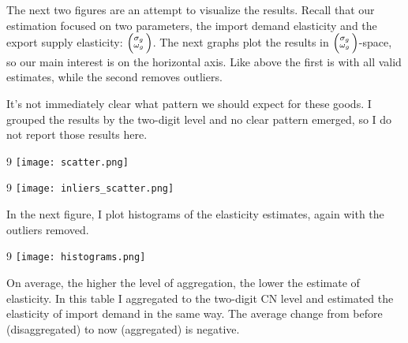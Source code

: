 \documentclass[12pt,a4paper]{article}                      %
\begin{document}
\newpage

The next two figures are an attempt to visualize the results.
Recall that our estimation focused on two parameters, the import demand elasticity and the export supply elasticity: $\Bigl(\negthinspace\begin{smallmatrix}\sigma_g\\\omega_g\end{smallmatrix}\Bigr)$.
The next graphs plot the results in $\Bigl(\negthinspace\begin{smallmatrix}\sigma_g\\\omega_g\end{smallmatrix}\Bigr)$-space, so our main interest is on the horizontal axis.
Like above the first is with all valid estimates, while the second removes outliers.

It's not immediately clear what pattern we should expect for these goods.
I grouped the results by the two-digit level and no clear pattern emerged, so I do not report those results here.

\begin{landscape}
\thispagestyle{empty}
\begin{center}
\footnotesize 9
    \texttt{[image: scatter.png]}
\end{center}
\end{landscape}
\restoregeometry


\begin{landscape}
\thispagestyle{empty}
\begin{center}
\footnotesize 9
    \texttt{[image: inliers\_scatter.png]}
\end{center}
\end{landscape}
\restoregeometry

In the next figure, I plot histograms of the elasticity estimates, again with the outliers removed.

\begin{landscape}
\thispagestyle{empty}
\begin{center}
\footnotesize 9
    \texttt{[image: histograms.png]}
\end{center}
\end{landscape}
\restoregeometry

On average, the higher the level of aggregation, the lower the estimate of elasticity.
In this table I aggregated to the two-digit CN level and estimated the elasticity of import demand in the same way.
The average change from before (disaggregated) to now (aggregated) is negative.\\

\noindent
\label{tab:two_means}




\end{document}

